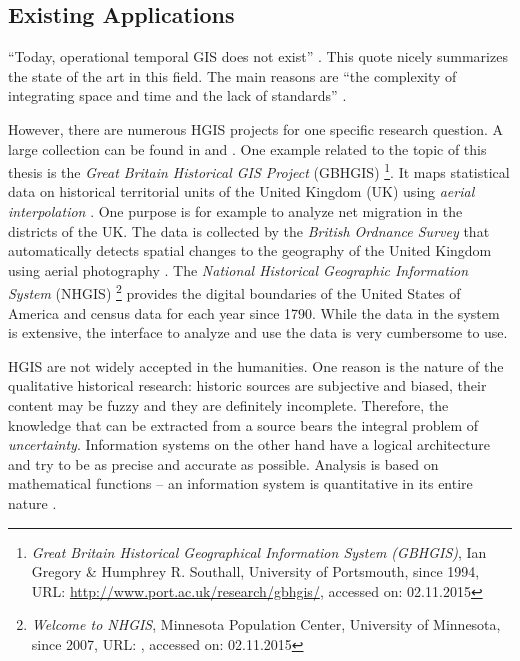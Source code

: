 
\subsection{Existing Applications} %
\label{sub:applications}

``Today, operational temporal GIS does not exist''
\cite[p. 5]{raza12}.
This quote nicely summarizes the state of the art in this field. The main reasons are ``the complexity of integrating space and time and the lack of standards''
\cite[p. 5]{raza12}.

However, there are numerous HGIS projects for one specific research question. A large collection can be found in \cite{knowles2008placing} and \cite{gregory2014toward}.
One example related to the topic of this thesis is the \emph{Great Britain Historical GIS Project} (GBHGIS)
\footnote{
  \textit{Great Britain Historical Geographical Information System (GBHGIS)},
  Ian Gregory \& Humphrey R. Southall, University of Portsmouth, since 1994,
  URL: \url{http://www.port.ac.uk/research/gbhgis/},
  accessed on: 02.11.2015
}.
It maps statistical data on historical territorial units of the United Kingdom (UK) using \emph{aerial interpolation}
\cite{aerialInterpolation}.
One purpose is for example to analyze net migration in the districts of the UK. The data is collected by the \emph{British Ordnance Survey} that automatically detects spatial changes to the geography of the United Kingdom using aerial photography \cite{ordnanceSurvey}.
The \emph{National Historical Geographic Information System} (NHGIS)
\footnote{
  \textit{Welcome to NHGIS},
  Minnesota Population Center, University of Minnesota,
  since 2007,
  URL: \url{},
  accessed on: 02.11.2015
}
provides the digital boundaries of the United States of America and census data for each year since 1790. While the data in the system is extensive, the interface to analyze and use the data is very cumbersome to use.

HGIS are not widely accepted in the humanities. One reason is the nature of the qualitative historical research: historic sources are subjective and biased, their content may be fuzzy and they are definitely incomplete. Therefore, the knowledge that can be extracted from a source bears the integral problem of \emph{uncertainty}. Information systems on the other hand have a logical architecture and try to be as precise and accurate as possible. Analysis is based on mathematical functions -- an information system is quantitative in its entire nature
\cite[p. 2]{knowles2008placing}.


